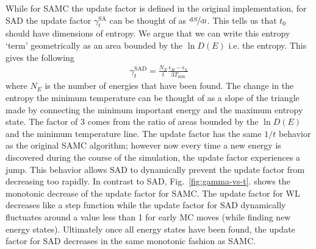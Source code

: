 \documentclass[letterpaper,twocolumn,amsmath,amssymb,pre,aps,10pt]{revtex4-1}
\begin{document}
While for SAMC the update factor is defined in the original
implementation, for SAD the update factor $\gamma_{t}^{\text{SA}}$ can
be thought of as $\nicefrac{\text{d}S}{\text{d}t}$. This tells us that
$t_0$ should have dimensions of entropy.  We argue that we can write
this entropy `term' geometrically as an area bounded by the $\ln{D(E)}$
i.e. the entropy. This gives the following
\begin{align}
\gamma_{t}^{\text{SAD}} =
\frac{N_E}{t}\frac{\epsilon_{H}-\epsilon_{L}}{3T_{\text{min}}}
\end{align}
where $N_E$ is the number of energies that have been found. The change
in the entropy the minimum temperature can be thought of as a slope of
the triangle made by connecting the minimum important energy and the
maximum entropy state.  The factor of $3$ comes from the ratio of areas
bounded by the $\ln{D(E)}$ and the minimum temperature line. The update
factor has the same $1/t$ behavior as the original SAMC algorithm;
however now every time a new energy is discovered during the course of
the simulation, the update factor experiences a jump. This behavior
allows SAD to dynamically prevent the update factor from decreasing too
rapidly. In contrast to SAD, Fig.~\ref{fig:gamma-vs-t}. shows the
monotonic decrease of the update factor for SAMC.  The update factor
for WL decreases like a step function while the update factor for SAD
dynamically fluctuates around a value less than 1 for early MC moves
(while finding new energy states).  Ultimately once all energy states
have been found, the update factor for SAD decreases in the same
monotonic fashion as SAMC.
\end{document}
